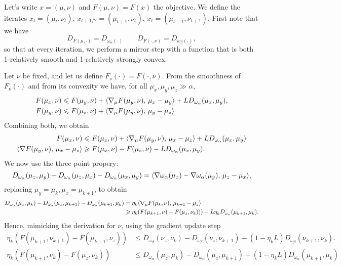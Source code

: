 \documentclass[a4paper, 10pt]{article}
\begin{document}
Let's write $x = (\mu, \nu)$  and $F(\mu, \nu) = F(x)$ the objective. We define the iterates $x_{t} = (\mu_t, \nu_t)$, $x_{t+1/2} = (\mu_{t+1}, \nu_t)$, 
$x_{t} = (\mu_{t+1}, \nu_{t+1})$. First note that we have
\begin{equation}
    D_{F(\mu, \cdot)} = D_{\omega_\alpha(\cdot)}\qquad D_{F(\cdot, \nu)} = D_{w_\beta(\cdot)},
\end{equation}
so that at every iteration, we perform a mirror step with a function that is both 1-relatively smooth and 1-relatively strongly convex.

Let $\nu$ be fixed, and let us define $F_\nu(\cdot) = F(\cdot, \nu)$. From the
smoothness of $F_\nu(\cdot)$ and from its convexity we have, for all 
$\mu_x, \mu_y, \mu_z \gg \alpha$,
\begin{align}
    F(\mu_x, \nu) &\leqslant F(\mu_y, \nu)
     + \langle \nabla_\mu F(\mu_y, \nu),\,\mu_x- \mu_y\rangle + L D_{\omega_\alpha}(\mu_x, \mu_y), \\
    F(\mu_y, \nu) &\leqslant F(\mu_z, \nu) + \langle \nabla_\mu F(\mu_y, \nu),\,\mu_y - \mu_z\rangle
\end{align}
Combining both, we obtain
\begin{align}
    F(\mu_x, \nu) &\leqslant F(\mu_z, \nu) + 
    \langle \nabla_\mu F(\mu_y, \nu),\,\mu_x - \mu_z\rangle + L D_{\omega_\alpha}(\mu_x, \mu_y) \\
    \langle \nabla F(\mu_y, \nu),\,\mu_x - \mu_z\rangle 
    &\geqslant F(\mu_x, \nu) - F(\mu_z, \nu) - L D_{\omega_\alpha}(\mu_x, \mu_y).
\end{align}
We now use the three point propery:
\begin{equation}
    D_{\omega_\alpha}(\mu_z, \mu_y) - D_{\omega_\alpha}(\mu_z, \mu_x) 
    - D_{\omega_\alpha}(\mu_x, \mu_y) 
    = \langle \nabla \omega_\alpha(\mu_x) - \nabla \omega_\alpha(\mu_y),\,\mu_z - \mu_x\rangle,
\end{equation}
replacing $\mu_y = \mu_{k}, \mu_x = \mu_{k+1}$, to obtain
\begin{align}
    D_{\omega_\alpha}(\mu_z, \mu_k) - D_{\omega_\alpha}(\mu_z, \mu_{k+1}) 
    - D_{\omega_\alpha}(\mu_{k+1}, \mu_k) &=
     \eta_k \langle \nabla_\mu F(\mu_k, \nu),\,\mu_{k+1} - \mu_z\rangle \\
    &\geqslant \eta_k (F(\mu_{k+1}, \nu) - F(\mu_z, \nu_k)))
     - L \eta_k D_{\omega_\alpha}(\mu_{k+1},\mu_k).
\end{align}
Hence, mimicking the derivation for $\nu$, using the gradient update step
\begin{align}
    \eta_k (F(\mu_{k+1},\nu_{k+1}) - F(\mu_{k+1}, \nu_z)) &\leq 
    D_{\omega_\beta}(\nu_z, \nu_k) - D_{\omega_\beta}(\nu_z, \nu_{k+1}) 
    - (1 - \eta_k L) D_{\omega_\beta}(\nu_{k+1}, \nu_k). \\
    \eta_k (F(\mu_{k+1},\nu_k) - F(\mu_z, \nu_k)) &\leq 
    D_{\omega_\alpha}(\mu_z, \mu_k) - D_{\omega_\alpha}(\mu_z, \mu_{k+1}) 
    - (1 - \eta_k L) D_{\omega_\alpha}(\mu_{k+1}, \mu_k)
\end{align}
\end{document}

